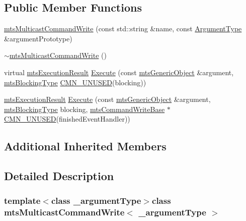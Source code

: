 \subsection*{Public Member Functions}
\begin{DoxyCompactItemize}
\item 
\hyperlink{classmts_multicast_command_write_af6df9513f0bbc9dccd2775429db99bb9}{mts\-Multicast\-Command\-Write} (const std\-::string \&name, const \hyperlink{classmts_multicast_command_write_a064ab3c37be15f5f41dc6fd39595f207}{Argument\-Type} \&argument\-Prototype)
\item 
\hyperlink{classmts_multicast_command_write_ae364a240cfc90e4c0cfa2316fc8471f8}{$\sim$mts\-Multicast\-Command\-Write} ()
\item 
virtual \hyperlink{classmts_execution_result}{mts\-Execution\-Result} \hyperlink{classmts_multicast_command_write_a791d2a0dd7453735f3c5859107f855fb}{Execute} (const \hyperlink{classmts_generic_object}{mts\-Generic\-Object} \&argument, \hyperlink{mts_forward_declarations_8h_ad7426ccb6c883bc780d0ee197dddcbe7}{mts\-Blocking\-Type} \hyperlink{cmn_portability_8h_a021894e2626935fa2305434b1e893ff6}{C\-M\-N\-\_\-\-U\-N\-U\-S\-E\-D}(blocking))
\item 
\hyperlink{classmts_execution_result}{mts\-Execution\-Result} \hyperlink{classmts_multicast_command_write_abdd5968cb00cca869eb59be2ff83cc1c}{Execute} (const \hyperlink{classmts_generic_object}{mts\-Generic\-Object} \&argument, \hyperlink{mts_forward_declarations_8h_ad7426ccb6c883bc780d0ee197dddcbe7}{mts\-Blocking\-Type} blocking, \hyperlink{classmts_command_write_base}{mts\-Command\-Write\-Base} $\ast$\hyperlink{cmn_portability_8h_a021894e2626935fa2305434b1e893ff6}{C\-M\-N\-\_\-\-U\-N\-U\-S\-E\-D}(finished\-Event\-Handler))
\end{DoxyCompactItemize}
\subsection*{Additional Inherited Members}


\subsection{Detailed Description}
\subsubsection*{template$<$class \-\_\-argument\-Type$>$class mts\-Multicast\-Command\-Write$<$ \-\_\-argument\-Type $>$}

